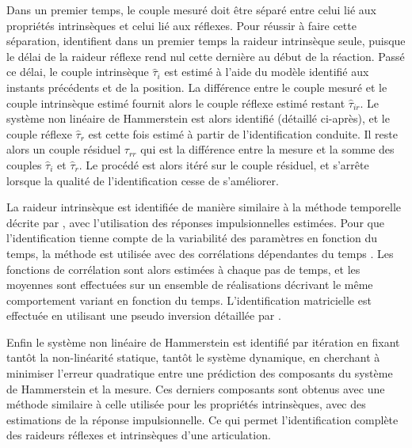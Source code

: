 Dans un premier temps, le couple mesuré doit être séparé entre celui lié aux propriétés intrinsèques et celui lié aux réflexes. Pour réussir à faire cette séparation, \textcite{kearney_identification_1997} identifient dans un premier temps la raideur intrinsèque seule, puisque le délai de la raideur réflexe rend nul cette dernière au début de la réaction. Passé ce délai, le couple intrinsèque $\hat{\tau}_{i}$ est estimé à l'aide du modèle identifié aux instants précédents et de la position. La différence entre le couple mesuré et le couple intrinsèque estimé fournit alors le couple réflexe estimé restant $\hat{\tau}_{ir}$. Le système non linéaire de Hammerstein est alors identifié (détaillé ci-après), et le couple réflexe $\hat{\tau}_{r}$ est cette fois estimé à partir de l'identification conduite. Il reste alors un couple résiduel $\tau_{rr}$ qui est la différence entre la mesure et la somme des couples $\hat{\tau}_{i}$ et $\hat{\tau}_{r}$. Le procédé est alors itéré sur le couple résiduel, et s'arrête lorsque la qualité de l'identification cesse de s'améliorer. 

La raideur intrinsèque est identifiée de manière similaire à la méthode temporelle décrite par \textcite{perreault_multiple-input_1999}, avec l'utilisation des réponses impulsionnelles estimées. Pour que l'identification tienne compte de la variabilité des paramètres en fonction du temps, la méthode est utilisée avec des corrélations dépendantes du temps \parencite{lortie_identification_2001}. Les fonctions de corrélation sont alors estimées à chaque pas de temps, et les moyennes sont effectuées sur un ensemble de réalisations décrivant le même comportement variant en fonction du temps. L'identification matricielle est effectuée en utilisant une pseudo inversion détaillée par \textcite{lortie_identification_2001}.

Enfin le système non linéaire de Hammerstein est identifié par itération en fixant tantôt la non-linéarité statique, tantôt le système dynamique, en cherchant à minimiser l'erreur quadratique entre une prédiction des composants du système de Hammerstein et la mesure. Ces derniers composants sont obtenus avec une méthode similaire à celle utilisée pour les propriétés intrinsèques, avec des estimations de la réponse impulsionnelle. Ce qui permet l'identification complète des raideurs réflexes et intrinsèques d'une articulation.


